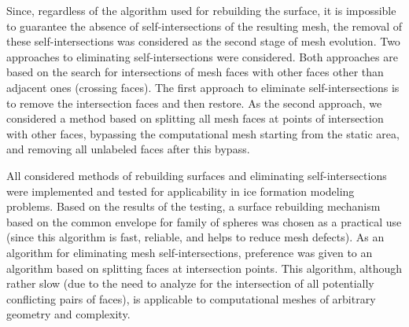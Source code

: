 \documentclass[
11pt,%
tightenlines,%
twoside,%
onecolumn,%
nofloats,%
nobibnotes,%
nofootinbib,%
superscriptaddress,%
noshowpacs,%
centertags]%
{revtex4-2}
\begin{document}
Since, regardless of the algorithm used for rebuilding the surface, it is impossible to guarantee the absence of self-intersections of the resulting mesh, the removal of these self-intersections was considered as the second stage of mesh evolution.
Two approaches to eliminating self-intersections were considered.
Both approaches are based on the search for intersections of mesh faces with other faces other than adjacent ones (crossing faces).
The first approach to eliminate self-intersections is to remove the intersection faces and then restore.
As the second approach, we considered a method based on splitting all mesh faces at points of intersection with other faces, bypassing the computational mesh starting from the static area, and removing all unlabeled faces after this bypass.

All considered methods of rebuilding surfaces and eliminating self-intersections were implemented and tested for applicability in ice formation modeling problems.
Based on the results of the testing, a surface rebuilding mechanism based on the common envelope for family of spheres was chosen as a practical use (since this algorithm is fast, reliable, and helps to reduce mesh defects).
As an algorithm for eliminating mesh self-intersections, preference was given to an algorithm based on splitting faces at intersection points.
This algorithm, although rather slow (due to the need to analyze for the intersection of all potentially conflicting pairs of faces), is applicable to computational meshes of arbitrary geometry and complexity.
\end{document}
